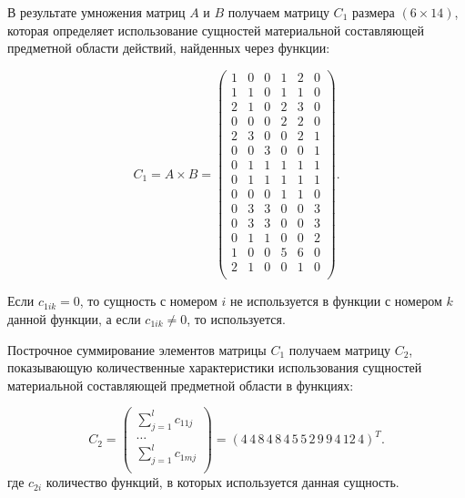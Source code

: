 В результате умножения матриц $A$ и $B$ получаем матрицу $C_1$ размера $(6\times14)$,
которая определяет использование сущностей материальной составляющей предметной области действий, найденных через функции:

\begin{equation}
    C_1 = A \times B = \begin{pmatrix}
        1 & 0 & 0 & 1 & 2 & 0 \\
        1 & 1 & 0 & 1 & 1 & 0 \\
        2 & 1 & 0 & 2 & 3 & 0 \\
        0 & 0 & 0 & 2 & 2 & 0 \\
        2 & 3 & 0 & 0 & 2 & 1 \\
        0 & 0 & 3 & 0 & 0 & 1 \\
        0 & 1 & 1 & 1 & 1 & 1 \\
        0 & 1 & 1 & 1 & 1 & 1 \\
        0 & 0 & 0 & 1 & 1 & 0 \\
        0 & 3 & 3 & 0 & 0 & 3 \\
        0 & 3 & 3 & 0 & 0 & 3 \\
        0 & 1 & 1 & 0 & 0 & 2 \\
        1 & 0 & 0 & 5 & 6 & 0 \\
        2 & 1 & 0 & 0 & 1 & 0 \\
    \end{pmatrix}.
\end{equation}

Если $c_{1ik} = 0$, то сущность с номером $i$ не используется в функции с номером $k$ данной функции,
а если $c_{1ik} \ne 0$, то используется.

Построчное суммирование элементов матрицы $C_1$ получаем матрицу $C_2$, показывающую количественные характеристики
использования сущностей материальной составляющей предметной области в функциях:

\begin{equation*}
    C_2 = \begin{pmatrix}
        \sum_{j=1}^l c_{11j} \\
        \ldots \\
        \sum_{j=1}^l c_{1mj} \\
    \end{pmatrix} 
    =
    \left( 4\, 4\, 8\, 4\, 8\, 4\, 5\, 5\, 2\, 9\, 9\, 4\, 12\, 4 \right)^T.
\end{equation*}
где $c_{2i}$ количество функций, в которых используется данная сущность.

